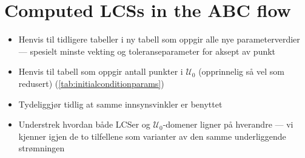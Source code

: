 \section{Computed LCSs in the ABC flow}
\label{sec:computed_lcss_in_the_abc_flow}

\begin{framed}
    \begin{itemize}
        \item Henvis til tidligere tabeller i ny tabell som oppgir alle
            nye parameterverdier --- spesielt minste vekting og toleranseparameter for aksept av punkt
        \item Henvis til tabell som oppgir antall punkter i $\mathcal{U}_{0}$ (opprinnelig så vel som redusert) (\cref{tab:initialconditionparams})
        \item Tydeliggjør tidlig at samme innsynsvinkler er benyttet
        \item Understrek hvordan både LCSer og $\mathcal{U}_{0}$-domener
            ligner på hverandre --- vi kjenner igjen de to tilfellene som
            varianter av den samme underliggende strømningen
    \end{itemize}
\end{framed}





